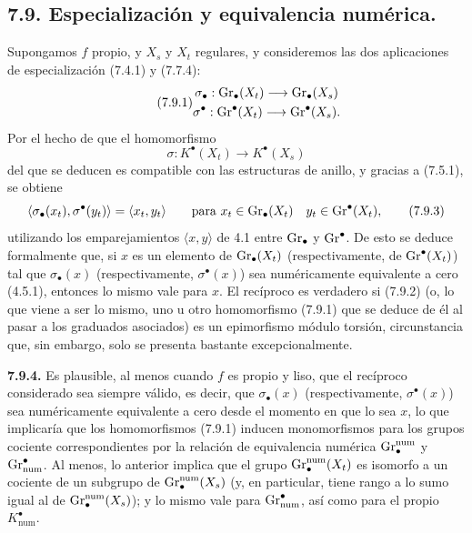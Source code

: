 \subsection*{7.9. Especialización y equivalencia numérica.}
Supongamos \(f\) propio, y \(X_s\) y \(X_t\) regulares, y consideremos las dos aplicaciones de especialización (7.4.1) y (7.7.4):
\begin{equation}\tag{7.9.1}
\begin{gathered}
  \sigma_\bullet:\operatorname{Gr}_\bullet(X_t)\longrightarrow\operatorname{Gr}_\bullet(X_s)\\
  \sigma^\bullet:\operatorname{Gr}^\bullet(X_t)\longrightarrow\operatorname{Gr}^\bullet(X_s).
\end{gathered}
\end{equation}
Por el hecho de que el homomorfismo
\begin{equation}\tag{7.9.2}
  \sigma:K^\bullet(X_t)\longrightarrow K^\bullet(X_s)
\end{equation}
del que se deducen es compatible con las estructuras de anillo, y gracias a (7.5.1), se obtiene
\[
  \langle\sigma_\bullet(x_t),\sigma^\bullet(y_t)\rangle
  =
  \langle x_t,y_t\rangle
  \qquad\text{para }
  x_t\in\operatorname{Gr}_\bullet(X_t)\quad y_t\in\operatorname{Gr}^\bullet(X_t),
\tag{7.9.3}
\]
utilizando los emparejamientos \(\langle x,y\rangle\) de 4.1 entre \(\operatorname{Gr}_\bullet\) y \(\operatorname{Gr}^\bullet\). De esto se deduce formalmente que, si \(x\) es un elemento de \(\operatorname{Gr}_\bullet(X_t)\) (respectivamente, de \(\operatorname{Gr}^\bullet(X_t)\)) tal que \(\sigma_\bullet(x)\) (respectivamente, \(\sigma^\bullet(x)\)) sea numéricamente equivalente a cero (4.5.1), entonces lo mismo vale para \(x\). El recíproco es verdadero si (7.9.2) (o, lo que viene a ser lo mismo, uno u otro homomorfismo (7.9.1) que se deduce de él al pasar a los graduados asociados) es un epimorfismo módulo torsión, circunstancia que, sin embargo, solo se presenta bastante excepcionalmente.

\textbf{7.9.4.} Es plausible, al menos cuando \(f\) es propio y liso, que el recíproco considerado sea siempre válido, es decir, que \(\sigma_\bullet(x)\) (respectivamente, \(\sigma^\bullet(x)\)) sea numéricamente equivalente a cero desde el momento en que lo sea \(x\), lo que implicaría que los homomorfismos (7.9.1) inducen monomorfismos para los grupos cociente correspondientes por la relación de equivalencia numérica \(\operatorname{Gr}^{\mathrm{num}}_\bullet\) y \(\operatorname{Gr}_{\mathrm{num}}^\bullet\). Al menos, lo anterior implica que el grupo \(\operatorname{Gr}_\bullet^{\mathrm{num}}(X_t)\) es isomorfo a un cociente de un subgrupo de \(\operatorname{Gr}_\bullet^{\mathrm{num}}(X_s)\) (y, en particular, tiene rango a lo sumo igual al de \(\operatorname{Gr}_\bullet^{\mathrm{num}}(X_s)\)); y lo mismo vale para \(\operatorname{Gr}_{\mathrm{num}}^\bullet\), así como para el propio \(K^\bullet_{\mathrm{num}}\).

